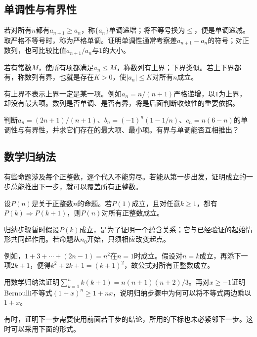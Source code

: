 \subsection{单调性与有界性}

若对所有\(n\)都有\(a_{n+1}\ge a_n\)，称\(\{a_n\}\){\heiti{}单调递增}；将不等号换为\(\le\)，便是{\heiti{}单调递减}。取严格不等号时，称为严格单调。证明单调性通常考察差\(a_{n+1}-a_n\)的符号；对正数列，也可比较比值\(a_{n+1}/a_n\)与\(1\)的大小。

若有常数\(M\)，使所有项都满足\(a_n\le M\)，称数列有上界；下界类似。若上下界都有，称数列{\heiti{}有界}，也就是存在\(K>0\)，使\(|a_n|\le K\)对所有\(n\)成立。

有上界不表示上界一定是某一项。例如\(a_n=n/(n+1)\)严格递增，以\(1\)为上界，却没有最大项。数列是否单调、是否有界，将是后面判断收敛性的重要依据。

\begin{example}
判断\(a_n=(2n+1)/(n+1)\)、\(b_n=(-1)^n(1-1/n)\)、\(c_n=n(6-n)\)的单调性与有界性，并求它们存在的最大项、最小项。有界与单调能否互相推出？
\end{example}

\subsection{数学归纳法}

有些命题涉及每个正整数，逐个代入不能穷尽。若能从第一步出发，证明成立的一步总能推出下一步，就可以覆盖所有正整数。

\begin{theorem}[第一数学归纳法]
设\(P(n)\)是关于正整数\(n\)的命题。若\(P(1)\)成立，且对任意\(k\ge1\)，都有\(P(k)\Rightarrow P(k+1)\)，则\(P(n)\)对所有正整数成立。
\end{theorem}

归纳步骤暂时假设\(P(k)\)成立，是为了证明一个蕴含关系；它与已经验证的起始情形共同起作用。若命题从\(n_0\)开始，只须相应改变起点。

例如，\(1+3+\cdots+(2n-1)=n^2\)在\(n=1\)时成立。假设对\(n=k\)成立，再添下一项\(2k+1\)，便得\(k^2+2k+1=(k+1)^2\)，故公式对所有正整数成立。

\begin{example}
用数学归纳法证明\(\sum_{k=1}^n k(k+1)=n(n+1)(n+2)/3\)。再对\(x\ge-1\)证明Bernoulli不等式\((1+x)^n\ge1+nx\)，说明归纳步骤中为何可以将不等式两边乘以\(1+x\)。
\end{example}

有时，证明下一步需要使用前面若干步的结论，所用的下标也未必紧邻下一步。这时可以采用下面的形式。

